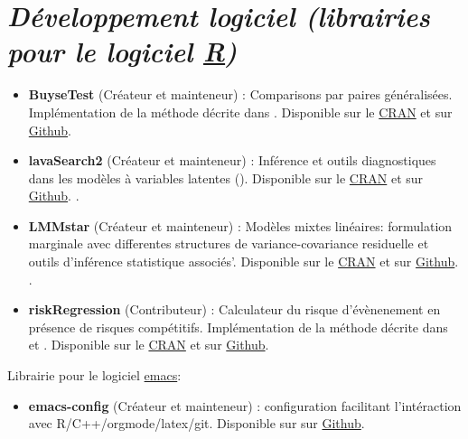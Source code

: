 \documentclass[12pt]{article}
\begin{document}
\section*{\emph{Développement logiciel (librairies pour le logiciel \href{https://www.r-project.org/}{R})}}
\label{sec:orgd909762}
\begin{minipage}{0.01\textwidth}
\hspace{\fill}
\end{minipage}
\begin{minipage}{0.92\textwidth}
\begin{itemize}
\item \textbf{BuyseTest} (Créateur et mainteneur) : Comparisons par paires
généralisées. Implémentation de la méthode décrite dans
\citep{peron2016extension,peron2021correcting}. Disponible sur le \href{https://cran.r-project.org/web/packages/BuyseTest/index.html}{CRAN}
et sur \href{https://github.com/bozenne/BuyseTest}{Github}.

\item \textbf{lavaSearch2} (Créateur et mainteneur) : Inférence et outils
diagnostiques dans les modèles à variables latentes
(\cite{ozenne2020small,ozenne2022controling}). Disponible sur
le \href{https://cran.r-project.org/web/packages/lavaSearch2/index.html}{CRAN} et sur \href{https://github.com/bozenne/lavaSearch2}{Github}. .

\item \textbf{LMMstar} (Créateur et mainteneur) : Modèles mixtes linéaires:
formulation marginale avec differentes structures de
variance-covariance residuelle et outils d'inférence statistique
associés'. Disponible sur le \href{https://cran.r-project.org/web/packages/LMMstar/index.html}{CRAN} et sur \href{https://github.com/bozenne/LMMstar}{Github}. .

\item \textbf{riskRegression} (Contributeur) : Calculateur du risque
d'évènenement en présence de risques compétitifs. Implémentation de
la méthode décrite dans \cite{ozenne2017riskregression} et
\cite{ozenne2020estimation}. Disponible sur le \href{https://cran.r-project.org/web/packages/riskRegression/index.html}{CRAN} et sur \href{https://github.com/tagteam/riskRegression}{Github}.
\end{itemize}
\end{minipage}

\bigskip

Librairie pour le logiciel \href{https://www.gnu.org/software/emacs/}{emacs}:
\begin{itemize}
\item \textbf{emacs-config} (Créateur et mainteneur) : configuration facilitant
l'intéraction avec R/C++/orgmode/latex/git. Disponible sur sur
\href{https://github.com/bozenne/emacs-config}{Github}.
\end{itemize}
\end{document}
